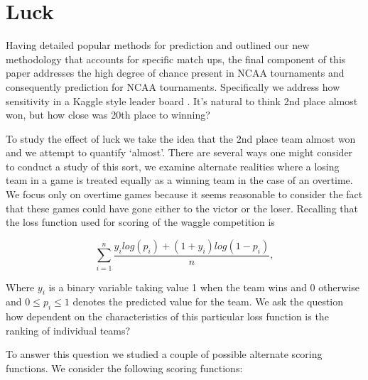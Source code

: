 
\section{Luck}

Having detailed popular methods for prediction and outlined our new methodology that accounts for specific match ups, the final component of this paper addresses the high degree of chance present in NCAA tournaments and consequently prediction for NCAA tournaments.  Specifically we address how sensitivity in a Kaggle style leader board . It's natural to think 2nd place almost won, but how close was 20th place to winning? 


To study the effect of luck we take the idea that the 2nd place team almost won and we attempt to quantify `almost'. There are several ways one might consider to conduct a study of this sort, we examine alternate realities where a losing team in a game is treated equally as a winning team in the case of an overtime. We focus only on overtime games because it seems reasonable to consider the fact that these games could have gone either to the victor or the loser. Recalling that the loss function used for scoring of the waggle competition is

\begin{equation}
\sum_{i=1}^n\frac{y_ilog(p_i)+ (1+y_i)log(1-p_i)}{n},
\end{equation}

Where $y_i$ is a binary variable taking value 1 when the team wins and 0 otherwise and $0 \leq p_i \leq 1$ denotes the predicted value for the team.  
We ask the question how dependent on the characteristics of this particular loss function is the ranking of individual teams? 

To answer this question we studied a couple of possible alternate scoring functions. We consider the following scoring functions: 
 

\begin{equation}

\end{equation} 

%

